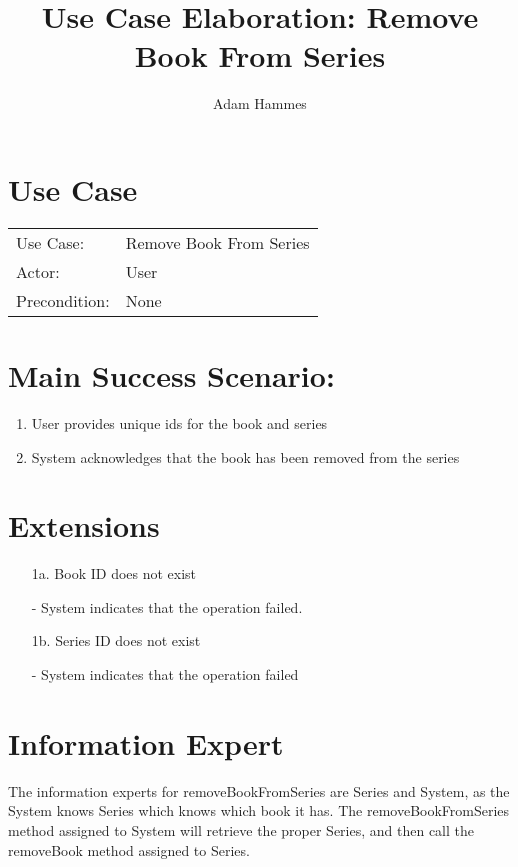 \documentclass{article}
\title{Use Case Elaboration: Remove Book From Series}
\author{Adam Hammes}
\begin{document}
\maketitle

\section*{Use Case}
\begin{tabular}{l l}
  Use Case:     & Remove Book From Series    \\
  Actor:        & User        \\
  Precondition: & None \\
\end{tabular}

\section*{Main Success Scenario:}
\begin{enumerate}
  \item User provides unique ids for the book and series
  \item System acknowledges that the book has been removed from the series
\end{enumerate}

\section*{Extensions}
\begin{itemize}
  \item [1a.] Book ID does not exist

    - System indicates that the operation failed.
    
  \item [1b.] Series ID does not exist
  
    - System indicates that the operation failed
\end{itemize}

\section*{Information Expert}

The information experts for removeBookFromSeries are Series and System, as the System knows
Series which knows which book it has.
The removeBookFromSeries method assigned to System will retrieve the proper Series, and then
call the removeBook method assigned to Series.
\end{document}
